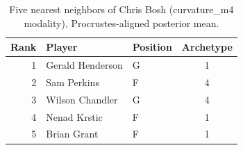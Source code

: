 \begin{table}[htbp]
  \centering\small
  \begin{tabular}{rllc}
    \toprule
    Rank & Player & Position & Archetype \\
    \midrule
    1 & Gerald Henderson & G & 1 \\
    2 & Sam Perkins & F & 4 \\
    3 & Wilson Chandler & G & 4 \\
    4 & Nenad Krstic & F & 1 \\
    5 & Brian Grant & F & 1 \\
    \bottomrule
  \end{tabular}
  \caption{Five nearest neighbors of Chris Bosh (curvature_m4 modality), Procrustes-aligned posterior mean.}
  \label{tab:Chris_Bosh_neighbors_curvature_m4}
\end{table}

